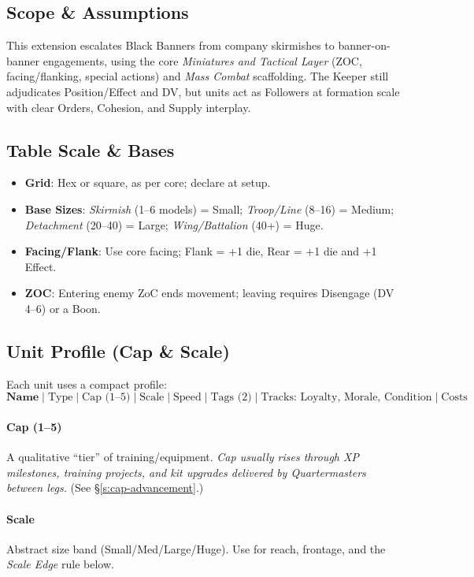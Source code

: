 \documentclass[11pt]{article}
\begin{document}
\subsection{Scope \& Assumptions}
This extension escalates Black Banners from company skirmishes to banner-on-banner engagements, using the core \emph{Miniatures and Tactical Layer} (ZOC, facing/flanking, special actions) and \emph{Mass Combat} scaffolding. The Keeper still adjudicates Position/Effect and DV, but units act as Followers at formation scale with clear Orders, Cohesion, and Supply interplay. %

\subsection{Table Scale \& Bases}
\begin{itemize}[leftmargin=*]
  \item \textbf{Grid}: Hex or square, as per core; declare at setup.
  \item \textbf{Base Sizes}: 
    \textit{Skirmish} (1--6 models) = Small; 
    \textit{Troop/Line} (8--16) = Medium; 
    \textit{Detachment} (20--40) = Large; 
    \textit{Wing/Battalion} (40+) = Huge.
  \item \textbf{Facing/Flank}: Use core facing; Flank = +1 die, Rear = +1 die and +1 Effect.
  \item \textbf{ZOC}: Entering enemy ZoC ends movement; leaving requires Disengage (DV 4--6) or a Boon. %
\end{itemize}

\subsection{Unit Profile (Cap \& Scale)}
Each unit uses a compact profile:
\[
\textbf{Name} \;|\; \text{Type} \;|\; \text{Cap (1--5)} \;|\; \text{Scale} \;|\; \text{Speed} \;|\; \text{Tags (2)} \;|\; 
\text{Tracks: Loyalty, Morale, Condition} \;|\; \text{Costs}
\]
\paragraph{Cap (1--5)} A qualitative ``tier'' of training/equipment. \emph{Cap usually rises through XP milestones, training projects, and kit upgrades delivered by Quartermasters between legs.} (See \S\ref{s:cap-advancement}.)
\paragraph{Scale} Abstract size band (Small/Med/Large/Huge). Use for reach, frontage, and the \emph{Scale Edge} rule below.
\end{document}
